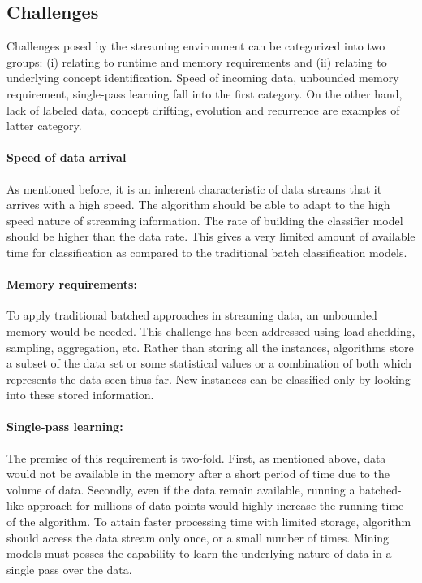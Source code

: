 \documentclass[a4paper, 11pt, oneside]{book}
\begin{document}
\subsection{Challenges}
Challenges posed by the streaming environment can be categorized into two groups: (i) relating to runtime and memory requirements and (ii) relating to underlying concept identification. Speed of incoming data, unbounded memory requirement, single-pass learning fall into the first category. On the other hand, lack of labeled data, concept drifting, evolution and recurrence are examples of latter category.

\paragraph{Speed of data arrival}
As mentioned before, it is an inherent characteristic of data streams that it arrives with a high speed. The algorithm should be able to adapt to the high speed nature of streaming information. The rate of building the classifier model should be higher than the data rate. This gives a very limited amount of available time for classification as compared to the traditional batch classification models.

\paragraph{Memory requirements:}
To apply traditional batched approaches in streaming data, an unbounded memory would be needed. This challenge has been addressed using load shedding, sampling, aggregation, etc. Rather than storing all the instances, algorithms store a subset of the data set or some statistical values or a combination of both which represents the data seen thus far. New instances can be classified only by looking into these stored information. 

\paragraph{Single-pass learning:}
The premise of this requirement is two-fold. First, as mentioned above, data would not be available in the memory after a short period of time due to the volume of data. Secondly, even if the data remain available, running a batched-like approach for millions of data points would highly increase the running time of the algorithm. To attain faster processing time with limited storage, algorithm should access the data stream only once, or a small number of times. Mining models must posses the capability to learn the underlying nature of data in a single pass over the data.
\end{document}
